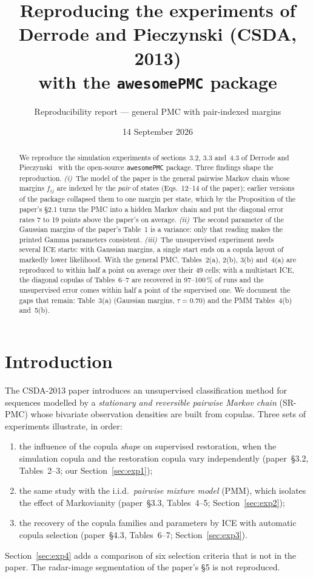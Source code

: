 \documentclass[11pt,a4paper]{article}
\title{Reproducing the experiments of \\
       Derrode and Pieczynski (CSDA, 2013) \\
       \vspace{2pt}\large with the \texttt{awesomePMC} package}
\author{Reproducibility report --- general PMC with pair-indexed margins}
\date{14 September 2026}
\begin{document}
\maketitle

\begin{abstract}
We reproduce the simulation experiments of sections~3.2, 3.3 and~4.3 of
Derrode and Pieczynski~\cite{derrode2013} with the open-source
\texttt{awesomePMC} package. Three findings shape the reproduction.
\emph{(i)}~The model of the paper is the general pairwise Markov chain whose
margins $f_{ij}$ are indexed by the \emph{pair} of states (Eqs.~12--14 of the
paper); earlier versions of the package collapsed them to one margin per
state, which by the Proposition of the paper's §2.1 turns the PMC into a
hidden Markov chain and put the diagonal error rates 7 to 19 points above the paper's on
average.
\emph{(ii)}~The second parameter of the Gaussian margins of the paper's
Table~1 is a variance: only that reading makes the printed Gamma parameters
consistent. \emph{(iii)}~The unsupervised experiment needs several ICE starts:
with Gaussian margins, a single start ends on a copula layout of markedly lower
likelihood.
With the general PMC, Tables~2(a), 2(b), 3(b) and~4(a) are reproduced to within
half a point on average over their 49 cells; with a multistart ICE, the
diagonal copulas of Tables~6--7 are recovered in 97--100\,\% of runs and the
unsupervised error comes within half a point of the supervised one. We document the gaps that
remain: Table~3(a) (Gaussian margins, $\tau=0.70$) and the PMM Tables~4(b)
and~5(b).
\end{abstract}

\section{Introduction}\label{sec:intro}

The CSDA-2013 paper introduces an unsupervised classification method for
sequences modelled by a \emph{stationary and reversible pairwise Markov
chain} (SR-PMC) whose bivariate observation densities are built from
copulas. Three sets of experiments illustrate, in order:
\begin{enumerate}
  \item the influence of the copula \emph{shape} on supervised restoration,
        when the simulation copula and the restoration copula vary
        independently (paper~§3.2, Tables~2--3; our Section~\ref{sec:exp1});
  \item the same study with the i.i.d.\ \emph{pairwise mixture model} (PMM),
        which isolates the effect of Markovianity (paper~§3.3, Tables~4--5;
        Section~\ref{sec:exp2});
  \item the recovery of the copula families and parameters by ICE with
        automatic copula selection (paper~§4.3, Tables~6--7;
        Section~\ref{sec:exp3}).
\end{enumerate}
Section~\ref{sec:exp4} adds a comparison of six selection criteria that is
not in the paper. The radar-image segmentation of the paper's §5 is not
reproduced.
\end{document}

